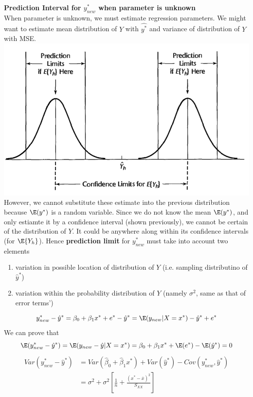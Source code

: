 \documentclass[11pt]{article}
\begin{document}
\begin{defn*}
	\textbf{Prediction Interval for $y^*_{new}$ when parameter is unknown} \\
	When parameter is unknown, we must estimate regression parameters. We might want to estimate mean distribution of $Y$ with $\hat{y^*}$ and variance of distribution of $Y$ with MSE. 
	\includegraphics[width=\textwidth/2]{prediction_interval_conf_lim}  \\
	However, we cannot substitute these estimate into the previous distribution because $\E(y^*)$ is a random variable. Since we do not know the mean $\E(y^*)$, and only estiamte it by a confidence interval (shown previously), we cannot be certain of the distribution of $Y$. It could be anywhere along within its confidence intervals (for $\E\{Y_h\}$). Hence \textbf{prediction limit} for $y^*_{new}$ must take into account two elements
	\begin{enumerate}
		\item variation in possible location of distribution of $Y$ (i.e. sampling distributino of $\hat{y}^*$)
		\item variation within the probability distribution of $Y$ (namely $\sigma^2$, same as that of error terms')
	\end{enumerate}
	\[
		y^*_{new} - \hat{y}^* = \beta_0 + \beta_1 x^* + e^* - \hat{y}^* = \E(y_{new}|X=x^*) - \hat{y}^* + e^*
	\]
	We can prove that
	\[
		\E(y^*_{new} - \hat{y}^*) 
		= \E(y_{new} - \hat{y}|X = x^*)
		= \beta_0 + \beta_1 x^* + \E(e^*) - \E(\hat{y}^*)
		= 0
	\]
	\begin{align*}
		Var(y^*_{new} - \hat{y}^*) 
		&= Var(\hat{\beta}_0 + \hat{\beta}_1 x^*) + Var(\hat{y}^*) - Cov(y^*_{new}, \hat{y}^*)\\ 
		&= \sigma^2 + \sigma^2 \left[ \frac{1}{n} + \frac{(x^* - \overline{x})^2}{S_{XX}} \right]

\end{align*}
\end{defn*}
\end{document}
